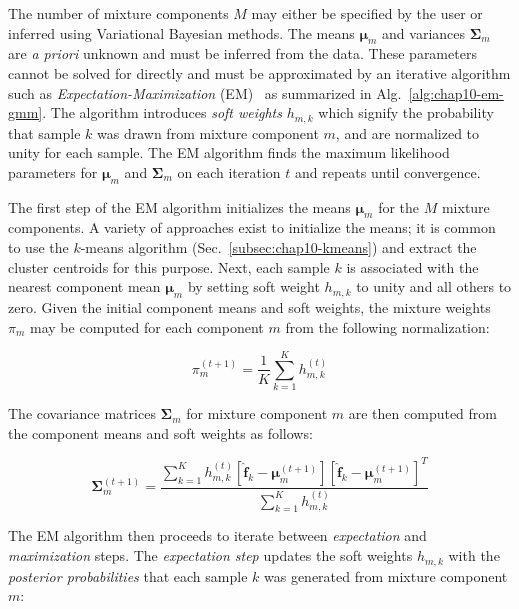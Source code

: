 
The number of mixture components $M$ may either be specified by the user or inferred using Variational Bayesian methods. The means $\boldsymbol{\mu}_{m}$ and variances $\boldsymbol{\Sigma}_{m}$ are \textit{a priori} unknown and must be inferred from the data. These parameters cannot be solved for directly and must be approximated by an iterative algorithm such as \textit{Expectation-Maximization} (EM)~\cite{dempster1977em} as summarized in Alg.~\ref{alg:chap10-em-gmm}. The algorithm introduces \textit{soft weights} $h_{m,k}$ which signify the probability that sample $k$ was drawn from mixture component $m$, and are normalized to unity for each sample. The EM algorithm finds the maximum likelihood parameters for $\boldsymbol{\mu}_{m}$ and $\boldsymbol{\Sigma}_{m}$ on each iteration $t$ and repeats until convergence. 

The first step of the EM algorithm initializes the means $\boldsymbol{\mu}_{m}$ for the $M$ mixture components. A variety of approaches exist to initialize the means; it is common to use the $k$-means algorithm (Sec.~\ref{subsec:chap10-kmeans}) and extract the cluster centroids for this purpose. Next, each sample $k$ is associated with the nearest component mean $\boldsymbol{\mu}_{m}$ by setting soft weight $h_{m,k}$ to unity and all others to zero. Given the initial component means and soft weights, the mixture weights $\pi_{m}$ may be computed for each component $m$ from the following normalization:

\begin{equation}
\label{eqn:em-weights}
\pi_{m}^{(t+1)} = \frac{1}{K}\displaystyle\sum\limits_{k=1}^{K} h_{m,k}^{(t)}
\end{equation}

\noindent The covariance matrices $\boldsymbol{\Sigma}_{m}$ for mixture component $m$ are then computed from the component means and soft weights as follows:

\begin{equation}
\label{eqn:em-covariances}
\boldsymbol{\Sigma}_{m}^{(t+1)} = \frac{\displaystyle\sum\limits_{k=1}^{K}h_{m,k}^{(t)}\left[ \boldsymbol{\hat{f}}_{k} - \boldsymbol{\mu}_{m}^{(t+1)}\right]\left[ \boldsymbol{\hat{f}}_{k} - \boldsymbol{\mu}_{m}^{(t+1)}\right]^{T}}{\displaystyle\sum\limits_{k=1}^{K}h_{m,k}^{(t)}}
\end{equation}

The EM algorithm then proceeds to iterate between \textit{expectation} and \textit{maximization} steps. The \textit{expectation step} updates the soft weights $h_{m,k}$ with the \textit{posterior probabilities} that each sample $k$ was generated from mixture component $m$:

